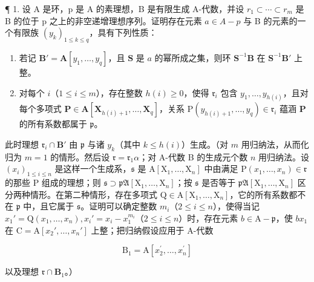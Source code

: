
¶ 1. 设 A 是环，p 是 A 的素理想，B 是有限生成 A-代数，并设 \(r_{1} \subset \cdots \subset r_{m}\) 是 B 的位于 p 之上的非空递增理想序列。证明存在元素 \(a \in A - p\) 与 B 的元素的一个有限族 \((y_{k})_{1 \leqslant k \leqslant q}\)，具有下列性质：

\begin{enumerate}
\def\labelenumi{(\arabic{enumi})}
\item
  若记 \(\mathbf{B}' = \mathbf{A}[y_1, \ldots, y_q]\)，且 \(\mathbf{S}\) 是 \(a\) 的幂所成之集，则环 \(\mathbf{S}^{-1}\mathbf{B}\) 在 \(\mathbf{S}^{-1}\mathbf{B}'\) 上整。
\item
  对每个 \(i\)（\(1 \leqslant i \leqslant m\)），存在整数 \(h(i) \geqslant 0\)，使得 \(\mathfrak{r}_i\) 包含 \(y_1, \ldots, y_{h(i)}\)，且对每个多项式 \(\mathbf{P} \in \mathbf{A}[\mathbf{X}_{h(i)+1}, \ldots, \mathbf{X}_q]\)，关系 \(\mathrm{P}(y_{h(i)+1}, \ldots, y_q) \in \mathfrak{r}_i\) 蕴涵 \(\mathbf{P}\) 的所有系数都属于 \(\mathfrak{p}\)。
\end{enumerate}

此时理想 \(\mathfrak{r}_i\cap \mathbf{B}'\) 由 \(\mathfrak{p}\) 与诸 \(y_{k}\)（其中 \(k\leqslant h(i)\)）生成。（对 \(m\) 用归纳法，从而化归为 \(m = 1\) 的情形。然后设 \(\mathfrak{r} = \mathfrak{r}_1\alpha\)；对 A-代数 B 的生成元个数 \(n\) 用归纳法。设 \((x_{i})_{1\leqslant i\leqslant n}\) 是这样一个生成系，\(\mathfrak{s}\) 是 \(\mathrm{A}[\mathrm{X}_1,\dots ,\mathrm{X}_n]\) 中由满足 \(\mathrm{P}(x_1,\ldots ,x_n)\in \mathfrak{r}\) 的那些 P 组成的理想；则 \(\mathfrak{s}\supset \mathfrak{pA}[\mathrm{X}_1,\ldots ,\mathrm{X}_n]\)；按 \(\mathfrak{s}\) 是否等于 \(\mathfrak{pA}[\mathrm{X}_1,\ldots ,\mathrm{X}_n]\) 区分两种情形。在第二种情形，存在多项式 \(\mathrm{Q}\in \mathrm{A}[\mathrm{X}_1,\ldots ,\mathrm{X}_n]\)，它的所有系数都不在 \(\mathfrak{p}\) 中，且它属于 \(\mathfrak{s}\)。证明可以确定整数 \(m_i\)（\(2\leqslant i\leqslant n\)），使得当记 \(x_1' = \mathrm{Q}(x_1,\ldots ,x_n),x_i' = x_i - x_1^{m_i}\)（\(2\leqslant i\leqslant n\)）时，存在元素 \(b\in \mathrm{A} - \mathfrak{p}\)，使 \(bx_{1}\) 在 \(\mathrm{C} = \mathrm{A}[x_2',\ldots ,x_n']\) 上整；把归纳假设应用于 A-代数

\[
\mathrm{B} _ {1} = \mathrm{A} [ x _ {2} ^ {\prime}, \dots , x _ {n} ^ {\prime} ]
\]

以及理想 \(\mathfrak{r} \cap \mathbf{B}_1\)。）

